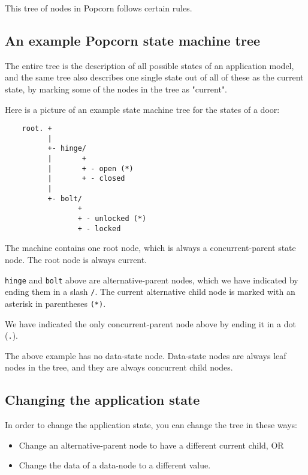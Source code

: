 \documentclass[12pt]{article}
\begin{document}
This tree of nodes in Popcorn follows certain rules.

\subsection{An example Popcorn state machine tree}

The entire tree is the description of all possible states of an
application model, and the same tree also describes one single state
out of all of these as the current state, by marking some of the nodes
in the tree as "current".

Here is a picture of an example state machine tree for the states of a
door:

\begin{verbatim}
    root. +
          |
          +- hinge/
          |       +
          |       + - open (*)
          |       + - closed
          |
          +- bolt/
                 +
                 + - unlocked (*)
                 + - locked
\end{verbatim}

The machine contains one root node, which is always a
concurrent-parent state node. The root node is always current.

\verb`hinge` and \verb`bolt` above are alternative-parent nodes, which
we have indicated by ending them in a slash \verb`/`. The current
alternative child node is marked with an asterisk in parentheses
\verb`(*)`.

We have indicated the only concurrent-parent node above by ending it
in a dot (\verb`.`).

The above example has no data-state node. Data-state nodes are always
leaf nodes in the tree, and they are always concurrent child nodes.


\subsection{Changing the application state}

In order to change the application state, you can change the tree in
these ways:

\begin{itemize}

\item Change an alternative-parent node to have a different current child, OR
\item Change the data of a data-node to a different value.

\end{itemize}
\end{document}
